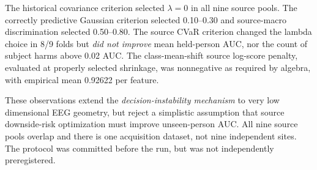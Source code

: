 The historical covariance criterion
selected $\lambda=0$ in all nine
source pools. The correctly predictive
Gaussian criterion selected 0.10--0.30
and source-macro discrimination
selected 0.50--0.80. The source CVaR
criterion changed the lambda choice
in 8/9 folds but \emph{did not
improve} mean held-person AUC,
nor the count of subject harms above
0.02 AUC. The class-mean-shift source
log-score penalty, evaluated at
properly selected shrinkage, was
nonnegative as required by algebra,
with empirical mean 0.92622 per feature.

These observations extend the
\emph{decision-instability mechanism}
to very low dimensional EEG geometry,
but reject a simplistic assumption
that source downside-risk optimization
must improve unseen-person AUC.
All nine source pools overlap and
there is one acquisition dataset,
not nine independent sites. The
protocol was committed before the
run, but was not independently
preregistered.
